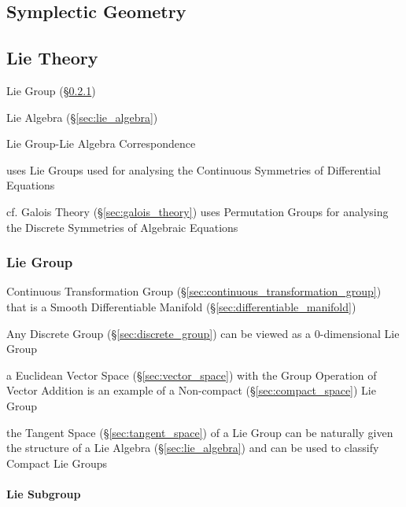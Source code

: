 \subsection{Symplectic Geometry}\label{sec:symplectic_geometry}

\subsection{Lie Theory}\label{sec:lie_theory}

Lie Group (\S\ref{sec:lie_group})

Lie Algebra (\S\ref{sec:lie_algebra})

Lie Group-Lie Algebra Correspondence

uses Lie Groups used for analysing the Continuous Symmetries of
Differential Equations %

cf. Galois Theory (\S\ref{sec:galois_theory}) uses Permutation Groups
for analysing the Discrete Symmetries of Algebraic Equations %



\subsubsection{Lie Group}\label{sec:lie_group}\hfill

Continuous Transformation Group
(\S\ref{sec:continuous_transformation_group}) that is a Smooth
Differentiable Manifold (\S\ref{sec:differentiable_manifold})

Any Discrete Group (\S\ref{sec:discrete_group}) can be viewed as a
$0$-dimensional Lie Group %

a Euclidean Vector Space (\S\ref{sec:vector_space}) with the Group Operation of
Vector Addition is an example of a Non-compact (\S\ref{sec:compact_space}) Lie
Group

the Tangent Space (\S\ref{sec:tangent_space}) of a Lie Group can be naturally
given the structure of a Lie Algebra (\S\ref{sec:lie_algebra}) and can be used
to classify Compact Lie Groups



\paragraph{Lie Subgroup}\label{sec:lie_subgroup}\hfill

